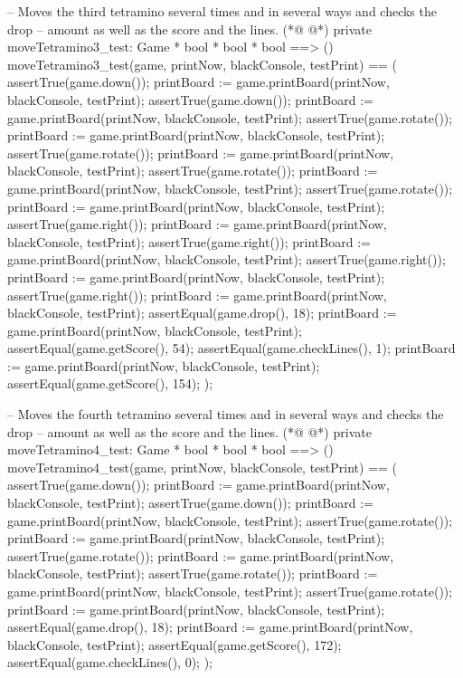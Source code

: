 \begin{vdmpp}[breaklines=true]
  -- Moves the third tetramino several times and in several ways and checks the drop
  -- amount as well as the score and the lines.
(*@
\label{moveTetramino3:test:340}
@*)
  private moveTetramino3_test: Game * bool * bool * bool ==> ()
  moveTetramino3_test(game, printNow, blackConsole, testPrint) == (
   assertTrue(game.down());
   printBoard := game.printBoard(printNow, blackConsole, testPrint);
   assertTrue(game.down());
   printBoard := game.printBoard(printNow, blackConsole, testPrint);
   assertTrue(game.rotate());
   printBoard := game.printBoard(printNow, blackConsole, testPrint);
   assertTrue(game.rotate());
   printBoard := game.printBoard(printNow, blackConsole, testPrint);
   assertTrue(game.rotate());
   printBoard := game.printBoard(printNow, blackConsole, testPrint);
   assertTrue(game.rotate());
   printBoard := game.printBoard(printNow, blackConsole, testPrint);
   assertTrue(game.right());
   printBoard := game.printBoard(printNow, blackConsole, testPrint);
   assertTrue(game.right());
   printBoard := game.printBoard(printNow, blackConsole, testPrint);
   assertTrue(game.right());
   printBoard := game.printBoard(printNow, blackConsole, testPrint);
   assertTrue(game.right());
   printBoard := game.printBoard(printNow, blackConsole, testPrint);
   assertEqual(game.drop(), 18);
   printBoard := game.printBoard(printNow, blackConsole, testPrint);
   assertEqual(game.getScore(), 54);
   assertEqual(game.checkLines(), 1);
   printBoard := game.printBoard(printNow, blackConsole, testPrint);
   assertEqual(game.getScore(), 154);
  );
  
  -- Moves the fourth tetramino several times and in several ways and checks the drop
  -- amount as well as the score and the lines.
(*@
\label{moveTetramino4:test:372}
@*)
  private moveTetramino4_test: Game * bool * bool * bool ==> ()
  moveTetramino4_test(game, printNow, blackConsole, testPrint) == (
   assertTrue(game.down());
   printBoard := game.printBoard(printNow, blackConsole, testPrint);
   assertTrue(game.down());
   printBoard := game.printBoard(printNow, blackConsole, testPrint);
   assertTrue(game.rotate());
   printBoard := game.printBoard(printNow, blackConsole, testPrint);
   assertTrue(game.rotate());
   printBoard := game.printBoard(printNow, blackConsole, testPrint);
   assertTrue(game.rotate());
   printBoard := game.printBoard(printNow, blackConsole, testPrint);
   assertTrue(game.rotate());
   printBoard := game.printBoard(printNow, blackConsole, testPrint);
   assertEqual(game.drop(), 18);
   printBoard := game.printBoard(printNow, blackConsole, testPrint);
   assertEqual(game.getScore(), 172);
   assertEqual(game.checkLines(), 0);
  );
  

\end{vdmpp}
